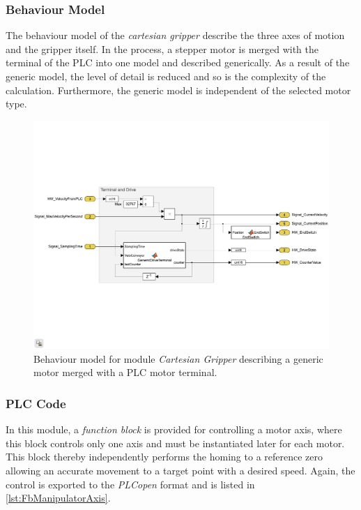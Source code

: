     \subsubsection{Behaviour Model}
    The behaviour model of the \textit{cartesian gripper} describe the three axes of motion and the gripper itself. In the process, a stepper motor is merged with the terminal of the PLC into one model and described generically. As a result of the generic model, the level of detail is reduced and so is the complexity of the calculation. Furthermore, the generic model is independent of the selected motor type.
    	\begin{figure}[htp]
		\centering
		\includegraphics[trim= 0mm 60mm 0mm 60mm, clip, width=0.95\linewidth]{figures/BehaviourModelKinGripper.pdf}
		\caption[Behaviour model for module \textit{Cartesian Gripper}.] {Behaviour model for module \textit{Cartesian Gripper} describing a generic motor merged with a PLC motor terminal.}
		\label{fig:ModuleCarthesianGripperBehaviourModel}
	\end{figure}
	
	
	\subsubsection{PLC Code}
	In this module, a \textit{function block} is provided for controlling a motor axis, where this block controls only one axis and must be instantiated later for each motor. This block thereby independently performs the homing to a reference zero allowing an accurate movement to a target point with a desired speed. Again, the control is exported to the \textit{PLCopen} format and is listed in \autoref{lst:FbManipulatorAxis}.
	
